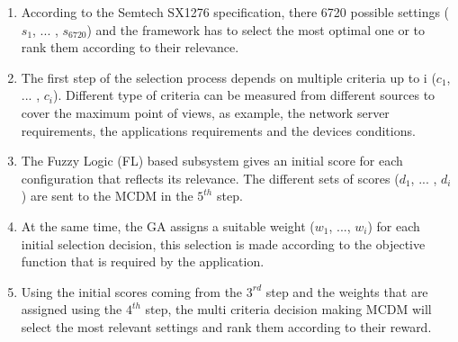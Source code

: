 \begin{enumerate}
\item According to the Semtech SX1276 specification\cite{lorasemtech},
	there  6720 possible settings ($s_{1}$, ... , $s_{6720}$) and the framework has to select the most optimal one or to rank them according to their relevance.
\item The first step of the selection process depends on multiple criteria up to i ($c_{1}$, ... , $c_{i}$).
	Different type of criteria can be measured from different sources to cover the maximum point of views,
	as example,
	the network server requirements,
	the applications requirements and the devices conditions.
\item The Fuzzy Logic (FL) based subsystem gives an initial score for each configuration that reflects its relevance.
The different sets of scores ($d_{1}$, ... , $d_{i}$) are sent to the \ac{MCDM} in the $5^{th}$ step.
\item At the same time,
	the \ac{GA} \cite{alkhawlani_access_2008} assigns a suitable weight ($w_{1}$, ..., $w_{i}$) for each initial selection decision,
	this selection is made according to the objective function that is required by the application.
\item Using the initial scores coming from the $3^{rd}$ step and the weights that are assigned using the $4^{th}$ step,
	the multi criteria decision making{} \ac{MCDM} will select the most relevant settings and rank them according to their reward.
\end{enumerate}

